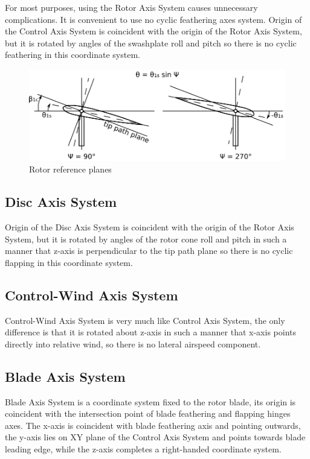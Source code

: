 For most purposes, using the Rotor Axis System causes unnecessary complications. It is convenient to use no cyclic feathering axes system. \cite{GessowMyers1985} Origin of the Control Axis System is coincident with the origin of the Rotor Axis System, but it is rotated by angles of the swashplate roll and pitch so there is no cyclic feathering in this coordinate system.

\begin{figure}[h!]
  \centering
  \includegraphics[width=120mm]{images/rotor_planes.eps}
  \caption{Rotor reference planes}
\end{figure}

\subsection{Disc Axis System}

Origin of the Disc Axis System is coincident with the origin of the Rotor Axis System, but it is rotated by angles of the rotor cone roll and pitch in such a manner that z-axis is perpendicular to the tip path plane so there is no cyclic flapping in this coordinate system.

\subsection{Control-Wind Axis System}

Control-Wind Axis System is very much like Control Axis System, the only difference is that it is rotated about z-axis in such a manner that x-axis points directly into relative wind, so there is no lateral airspeed component.

\subsection{Blade Axis System}

Blade Axis System is a coordinate system fixed to the rotor blade, its origin is coincident with the intersection point of blade feathering and flapping hinges axes. The x-axis is coincident with blade feathering axis and pointing outwards, the y-axis lies on XY plane of the Control Axis System and points towards blade leading edge, while the z-axis completes a right-handed coordinate system.


